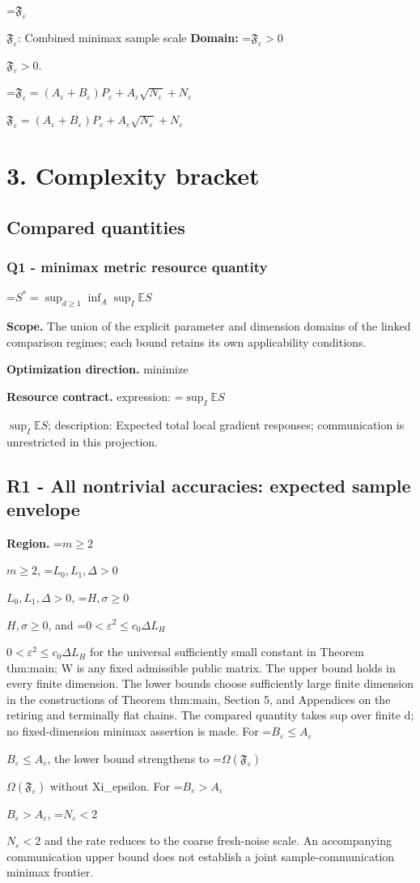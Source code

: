 \documentclass[10pt,a4paper]{article}
\newcommand{\AtlasMath}[1]{\par\begingroup\centering\setbox0=\hbox{$\displaystyle #1$}\ifdim\wd0>1.4\linewidth\typeout{ATLAS WIDE FORMULA: \the\wd0}\fi\ifdim\wd0>\linewidth\resizebox{\linewidth}{!}{\box0}\else\box0\fi\par\endgroup}
\newcommand{\AtlasInlineMath}[1]{\begingroup\setbox0=\hbox{$#1$}\ifdim\wd0>.4\linewidth\endgroup\AtlasMath{#1}\else\endgroup$#1$\fi}
\begin{document}
\AtlasInlineMath{\mathfrak F_\varepsilon}: Combined minimax sample scale \textbf{Domain:} \AtlasInlineMath{\mathfrak F_\varepsilon>0}.



\AtlasInlineMath{\mathfrak F_\varepsilon=(A_\varepsilon+B_\varepsilon)P_\varepsilon+A_\varepsilon\sqrt{N_\varepsilon}+N_\varepsilon}



\section{3. Complexity bracket}


\subsection{Compared quantities}


\subsubsection{Q1 - minimax metric resource quantity}


\AtlasMath{S^*=\sup_{d\ge1}\inf_A\sup_I\mathbb E S}


\textbf{Scope.} The union of the explicit parameter and dimension domains of the linked comparison regimes; each bound retains its own applicability conditions.



\textbf{Optimization direction.} minimize



\textbf{Resource contract.} expression: \AtlasInlineMath{\sup_I\mathbb E S}; description: Expected total local gradient responses; communication is unrestricted in this projection.



\subsection{R1 - All nontrivial accuracies: expected sample envelope}


\textbf{Region.} \AtlasInlineMath{m\ge2}, \AtlasInlineMath{L_0,L_1,\Delta>0}, \AtlasInlineMath{H,\sigma\ge0}, and \AtlasInlineMath{0<\varepsilon^2\le c_0\Delta L_H} for the universal sufficiently small constant in Theorem thm:main; W is any fixed admissible public matrix. The upper bound holds in every finite dimension. The lower bounds choose sufficiently large finite dimension in the constructions of Theorem thm:main, Section 5, and Appendices on the retiring and terminally flat chains. The compared quantity takes sup over finite d; no fixed-dimension minimax assertion is made. For \AtlasInlineMath{B_\varepsilon\le A_\varepsilon}, the lower bound strengthens to \AtlasInlineMath{\Omega(\mathfrak F_\varepsilon)} without Xi\_epsilon. For \AtlasInlineMath{B_\varepsilon>A_\varepsilon}, \AtlasInlineMath{N_\varepsilon<2} and the rate reduces to the coarse fresh-noise scale. An accompanying communication upper bound does not establish a joint sample-communication minimax frontier.
\end{document}
